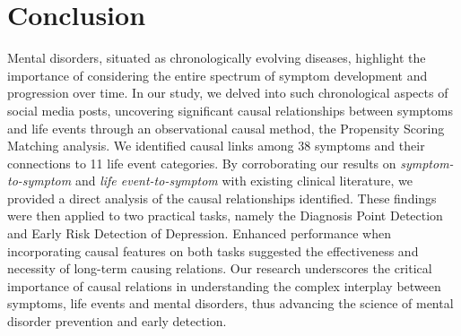 \section{Conclusion}
Mental disorders, situated as chronologically evolving diseases, highlight the importance of considering the entire spectrum of symptom development and progression over time. 
In our study, we delved into such chronological aspects of social media posts, uncovering significant causal relationships between symptoms and life events through an observational causal method, the Propensity Scoring Matching analysis. We identified causal links among 38 symptoms and their connections to 11 life event categories. By corroborating our results on \textit{symptom-to-symptom} and \textit{life event-to-symptom} with existing clinical literature, we provided a direct analysis of the causal relationships identified. These findings were then applied to two practical tasks, namely the Diagnosis Point Detection and Early Risk Detection of Depression. Enhanced performance when incorporating causal features on both tasks suggested the effectiveness and necessity of long-term causing relations. Our research underscores the critical importance of causal relations in understanding the complex interplay between symptoms, life events and mental disorders, thus advancing the science of mental disorder prevention and early detection. 

